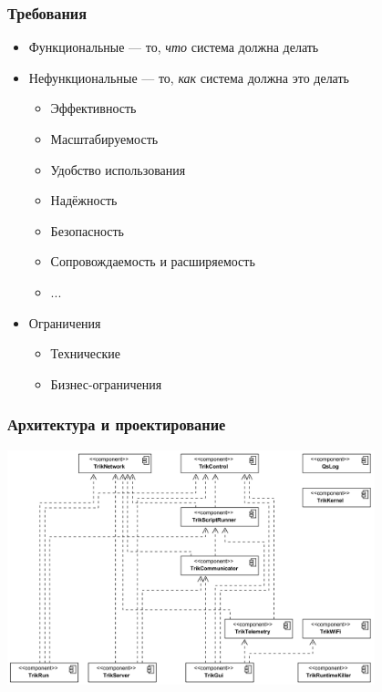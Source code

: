 \documentclass{../../slides-style}
\begin{document}
    \begin{frame}
        \frametitle{Требования}
        \begin{itemize}
            \item Функциональные --- то, \emph{что} система должна делать
            \item Нефункциональные --- то, \emph{как} система должна это делать
            \begin{itemize}
                \item Эффективность
                \item Масштабируемость
                \item Удобство использования
                \item Надёжность
                \item Безопасность
                \item Сопровождаемость и расширяемость
                \item ...
            \end{itemize}
            \item Ограничения
            \begin{itemize}
                \item Технические
                \item Бизнес-ограничения
            \end{itemize}
        \end{itemize}
    \end{frame}

    \begin{frame}
        \frametitle{Архитектура и проектирование}
        \begin{center}
            \includegraphics[width=0.8\textwidth]{trikRuntimeComponents.png}
        \end{center}
    \end{frame}
\end{document}
